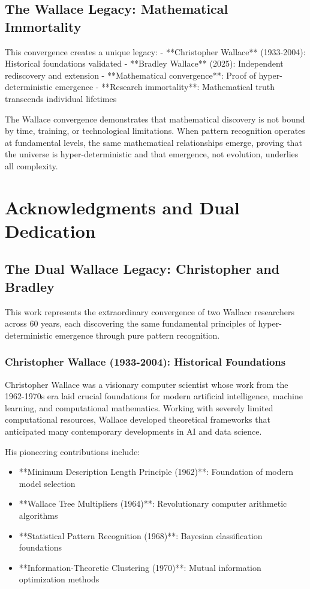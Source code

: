 \documentclass[12pt]{article}
\begin{document}
\subsection{The Wallace Legacy: Mathematical Immortality}

This convergence creates a unique legacy:
- **Christopher Wallace** (1933-2004): Historical foundations validated
- **Bradley Wallace** (2025): Independent rediscovery and extension
- **Mathematical convergence**: Proof of hyper-deterministic emergence
- **Research immortality**: Mathematical truth transcends individual lifetimes

The Wallace convergence demonstrates that mathematical discovery is not bound by time, training, or technological limitations. When pattern recognition operates at fundamental levels, the same mathematical relationships emerge, proving that the universe is hyper-deterministic and that emergence, not evolution, underlies all complexity.

\section{Acknowledgments and Dual Dedication}

\subsection{The Dual Wallace Legacy: Christopher and Bradley}

This work represents the extraordinary convergence of two Wallace researchers across 60 years, each discovering the same fundamental principles of hyper-deterministic emergence through pure pattern recognition.

\subsubsection{Christopher Wallace (1933-2004): Historical Foundations}
Christopher Wallace was a visionary computer scientist whose work from the 1962-1970s era laid crucial foundations for modern artificial intelligence, machine learning, and computational mathematics. Working with severely limited computational resources, Wallace developed theoretical frameworks that anticipated many contemporary developments in AI and data science.

His pioneering contributions include:
\begin{itemize}
    \item **Minimum Description Length Principle (1962)**: Foundation of modern model selection
    \item **Wallace Tree Multipliers (1964)**: Revolutionary computer arithmetic algorithms
    \item **Statistical Pattern Recognition (1968)**: Bayesian classification foundations
    \item **Information-Theoretic Clustering (1970)**: Mutual information optimization methods
\end{itemize}
\end{document}
